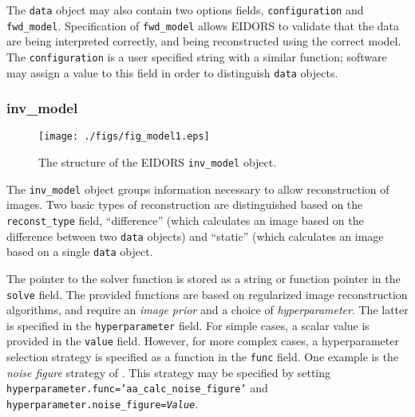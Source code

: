\documentclass[12pt]{iopart}
\begin{document}
The {\tt data} object may also contain two options fields,
{\tt configuration} and {\tt fwd\_model}. Specification
of {\tt fwd\_model} allows EIDORS to validate that the
data are being interpreted correctly, and being reconstructed
using the correct model. The {\tt configuration} is
a user specified string with a similar function; software
may assign a value to this field in order to distinguish
{\tt data} objects.


\subsubsection{inv\_model}

%
%
\begin{figure}[th]
\begin{flushright}
\texttt{[image: ./figs/fig\_model1.eps]}
\caption{\small The structure of the EIDORS {\tt inv\_model} object.
\label{fig:inv_model}
 }
\end{flushright}
\end{figure}

The {\tt inv\_model} object groups information necessary to 
allow reconstruction of images. Two basic types of reconstruction
are distinguished based on the {\tt reconst\_type} field, 
``difference'' (which calculates an image based on the difference
between two {\tt data} objects) and ``static'' (which calculates an
image based on a single {\tt data} object.

The pointer to the solver function is stored as a string or function
pointer in the {\tt solve} field. The provided functions are based
on regularized image reconstruction algorithms, and require 
an {\em image prior} and a choice of {\em hyperparameter}. 
The latter is specified in the {\tt hyperparameter} field. For
simple cases, a scalar value is provided in the {\tt value} field.
However, for more complex cases, a hyperparameter selection strategy
is specified as a function in the {\tt func} field. One example
is the {\em noise figure} strategy of \cite{Adler_and_Guardo_1996}.
This strategy may be specified by setting
 {\tt hyperparameter.func='aa\_calc\_noise\_figure'}
and 
 {\tt hyperparameter.noise\_figure=\em Value}.
\end{document}
